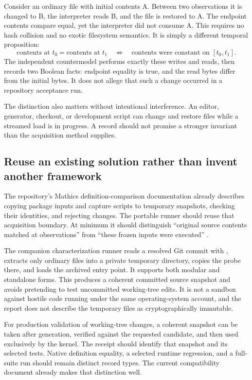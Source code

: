 \documentclass[11pt,a4paper]{article}
\newcommand{\code}[1]{\texttt{\detokenize{#1}}}
\theoremstyle{remark}
\begin{document}
Consider an ordinary file with initial contents A. Between two observations it is changed to B, the interpreter reads B, and the file is restored to A. The endpoint contents compare equal, yet the interpreter did not consume A. This requires no hash collision and no exotic filesystem semantics. It is simply a different temporal proposition:
\[
 \text{contents at }t_0=\text{contents at }t_1
 \quad\not\Rightarrow\quad
 \text{contents were constant on }[t_0,t_1].
\]
The independent countermodel performs exactly these writes and reads, then records two Boolean facts: endpoint equality is true, and the read bytes differ from the initial bytes. It does not allege that such a change occurred in a repository acceptance run.

The distinction also matters without intentional interference. An editor, generator, checkout, or development script can change and restore files while a streamed load is in progress. A record should not promise a stronger invariant than the acquisition method supplies.

\subsection{Reuse an existing solution rather than invent another framework}

The repository's Mathics definition-comparison documentation already describes copying package inputs and capture scripts to temporary snapshots, checking their identities, and rejecting changes. The portable runner should reuse that acquisition boundary. At minimum it should distinguish ``original source contents matched at observations'' from ``these frozen inputs were executed'' \cite{compatibility}.

The companion characterization runner reads a resolved Git commit with \code{git archive}, extracts only ordinary files into a private temporary directory, copies the probe there, and loads the archived entry point. It supports both modular and standalone forms. This produces a coherent committed source snapshot and avoids pretending to test uncommitted working-tree edits. It is not a sandbox against hostile code running under the same operating-system account, and the report does not describe the temporary files as cryptographically immutable.

For production validation of working-tree changes, a coherent snapshot can be taken after generation, verified against the requested candidate, and then used exclusively by the kernel. The receipt should identify that snapshot and its selected tests. Native definition equality, a selected runtime regression, and a full-suite run should remain distinct record types. The current compatibility document already makes that distinction well.
\end{document}

